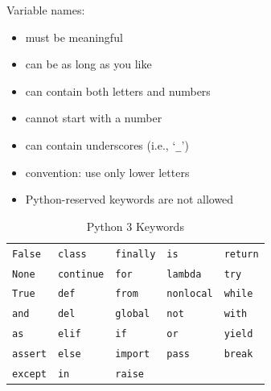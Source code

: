 \documentclass[t,handout,9pt]{beamer}
\begin{document}
\begin{frame}
Variable names:
\begin{itemize}
	\item must be meaningful
	\item can be as long as you like
	\item can contain both letters and numbers
	\item cannot start with a number
	\item can contain underscores (i.e., `\texttt{\_}')
	\item convention: use only lower letters
	\item Python-reserved keywords are not allowed
\end{itemize}
\begin{table}[]
\centering
\caption{Python 3 Keywords}
\begin{tabular}{lllll}
\texttt{False } & \texttt{class   } & \texttt{finally} & \texttt{is      } & \texttt{return} \\
\texttt{None  } & \texttt{continue} & \texttt{for    } & \texttt{lambda  } & \texttt{try   } \\
\texttt{True  } & \texttt{def     } & \texttt{from   } & \texttt{nonlocal} & \texttt{while } \\
\texttt{and   } & \texttt{del     } & \texttt{global } & \texttt{not     } & \texttt{with  } \\
\texttt{as    } & \texttt{elif    } & \texttt{if     } & \texttt{or      } & \texttt{yield } \\
\texttt{assert} & \texttt{else    } & \texttt{import } & \texttt{pass    } & \texttt{break } \\
\texttt{except} & \texttt{in      } & \texttt{raise  } &          &
\end{tabular}
\end{table}
\end{frame}
%
\end{document}
